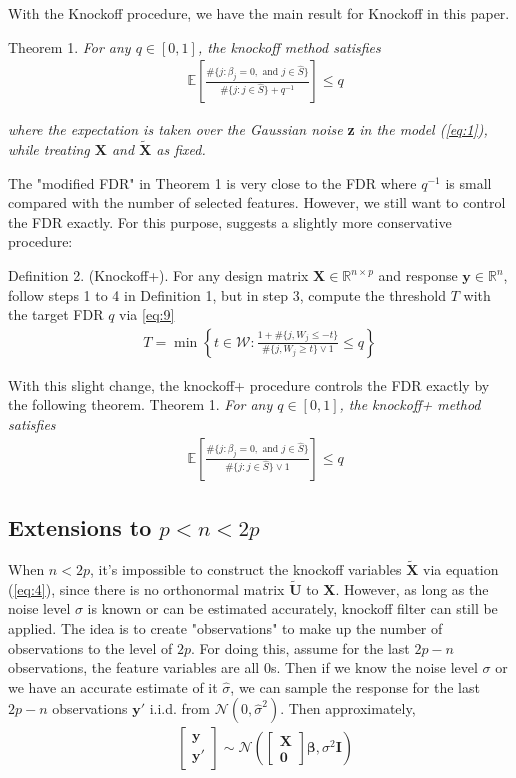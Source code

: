 \documentclass{uwstat572}
\begin{document}
With the Knockoff procedure, we have the main result for Knockoff in this paper.

{\sc Theorem 1. } {\it For any $q\in[0,1]$, the knockoff method satisfies }
\begin{align*}
& \mathbb{E}\left[\frac{\#\{j:\beta_j=0,\text{ and }j\in \hat{S} \}}{\#\{j:j\in \hat{S} \} + q^{-1}} \right]\leq q
\end{align*}

{\it where the expectation is taken over the Gaussian noise }\textbf{z} {\it in the model (\ref{eq:1}), while treating $\bm{X}$ and $\bm{\tilde{X}}$ as fixed. }

The "modified FDR" in Theorem 1 is very close to the FDR where $q^{-1}$ is small compared with the number of selected features. However, we still want to control the FDR exactly. For this purpose, \cite{barber2015controlling} suggests a slightly more conservative procedure:

{\sc Definition 2. }(Knockoff+). For any design matrix $\bm{X}\in\mathbb{R}^{n\times p}$ and response $\bm{y}\in \mathbb{R}^n$, 
follow steps 1 to 4 in {\sc Definition 1}, but in step 3, compute the threshold $T$ with the target FDR $q$ via \ref{eq:9}
\begin{align}\label{eq:9}
T  = \min\left\{t\in\mathcal{W}: \frac{1+\#\{j, W_j\leq -t\}}{\#\{j, W_j\geq t\}\vee 1}\leq q \right\}
\end{align}

With this slight change, the knockoff+ procedure controls the FDR exactly by the following theorem.
{\sc Theorem 1. } {\it For any $q\in[0,1]$, the knockoff+ method satisfies }
\begin{align*}
& \mathbb{E}\left[\frac{\#\{j:\beta_j=0,\text{ and }j\in \hat{S} \}}{\#\{j:j\in \hat{S} \}\vee 1} \right]\leq q
\end{align*}

\subsection{Extensions to $p<n<2p$}
When $n< 2p$, it's impossible to construct the knockoff variables $\tilde{\bm{X}}$ via equation (\ref{eq:4}), since there is no orthonormal matrix $\tilde{\bm{U}}$ to $\bm{X}$. However, as long as the noise level $\sigma$ is known or can be estimated accurately, knockoff filter can still be applied. The idea is to create "observations" to make up the number of observations to the level of $2p$. For doing this, assume for the last $2p-n$ observations, the feature variables are all $0$s. Then if we know the noise level $\sigma$ or we have an accurate estimate of it $\hat\sigma$, we can sample the response for the last $2p-n$ observations $\bm{y}'$ i.i.d. from $\mathcal{N}(0, \hat{\sigma}^2)$. Then approximately, 
\begin{align*}
& \begin{bmatrix}\bm{y} \\ \bm{y'}\end{bmatrix} \sim 
\mathcal{N}\left(\begin{bmatrix}\bm{X} \\ \bm{0}\end{bmatrix}\bm{\beta}, \sigma^2 \bm{I} \right)
\end{align*}
\end{document}
